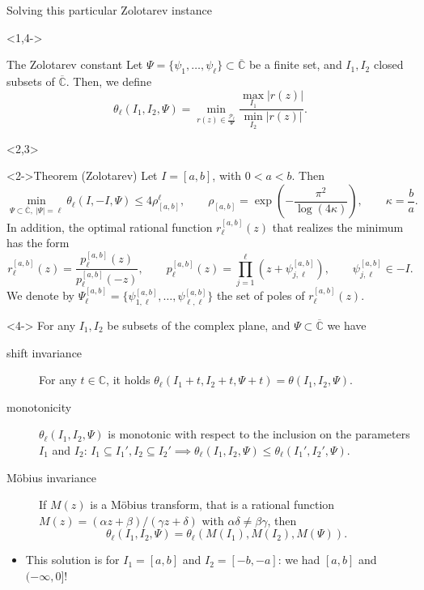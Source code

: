 \documentclass[aspectratio=169,xcolor=dvipsnames]{beamer}
\newcommand{\pole}{\psi}
\newcommand{\Pole}{\Psi}
\begin{document}
	\begin{frame}{\faHammer\;Solving this particular Zolotarev instance}
	
	\begin{onlyenv}<1,4->
	\begin{block}{The Zolotarev constant}
	Let $\Pole = \{\pole_1,\dots,\pole_\ell\} \subset \overline{\mathbb C}$ 
	be a finite set, and $I_1, I_2$ closed subsets of $\overline{\mathbb C}$. Then, we define
	\[
	\theta_\ell(I_1, I_2, \Pole) =  \min_{r(z)\in \frac{\mathcal P_\ell}{\Pole}} \frac{\max_{I_1}|r(z)|}{\min_{I_2}|r(z)|}.
	\]
	\end{block}
	\end{onlyenv}
	\begin{onlyenv}<2,3>
	\begin{alertblock}<2->{Theorem (Zolotarev)}
	Let $I = [a, b]$, with $0<a<b$. Then 
	\[
	\min_{\Pole\subset\overline{\mathbb  C}, \ |\Pole|=\ell }\theta_\ell(I,-I,\Pole) \leq 4\rho_{[a,b]}^{\ell},\qquad \rho_{[a,b]}=\exp\left(-\frac{\pi^2}{\log\left(4 \kappa\right)}\right),\qquad \kappa=\frac ba.
	\]
	In addition, the optimal rational function $r^{[a,b]}_\ell(z)$ that realizes the minimum
	has the form
	\[
	r^{[a,b]}_\ell(z) = \frac{p^{[a,b]}_\ell(z)}{p^{[a,b]}_\ell(-z)}, \qquad 
	p^{[a,b]}_\ell(z) = \prod_{j = 1}^\ell (z + \pole^{[a,b]}_{j,\ell}), \qquad 
	\pole^{[a,b]}_{j,\ell} \in -I. 
	\]
	We denote by $\Pole_{\ell}^{[a,b]} = \{ \pole_{1,\ell}^{[a,b]}, \dots, \pole_{\ell,\ell}^{[a,b]} \}$ the set of poles of $r^{[a,b]}_\ell(z)$.
	\end{alertblock}
	\end{onlyenv}

	\begin{onlyenv}<4->
	For any $I_1, I_2$ be subsets of the complex plane, and $\Pole\subset\overline{\mathbb C}$ we have
	\begin{description}
		\item[shift invariance] For any $t \in \mathbb C$, it holds
		$\theta_\ell(I_1 + t, I_2 + t, \Pole+t) = \theta(I_1, I_2, \Pole)$.
		\item[monotonicity] 
		$\theta_\ell(I_1, I_2, \Pole)$ is monotonic with respect to the
		inclusion on the parameters $I_1$ and $I_2$:
		$
		I_1 \subseteq I_1', I_2 \subseteq I_2' \implies 
		\theta_\ell(I_1, I_2, \Pole) \leq \theta_\ell(I_1', I_2', \Pole). 
		$
		\item[M\"obius invariance] If $M(z)$ is a M\"obius transform, that is a rational
		function $M(z) = (\alpha z + \beta) / (\gamma z + \delta)$ with $\alpha\delta \neq \beta\gamma$, then 
		\[
		\theta_\ell(I_1, I_2, \Pole) = \theta_\ell(M(I_1), M(I_2), M(\Pole)).
		\]
	\end{description}
	\end{onlyenv}

	\begin{itemize}
	\item[\alert{\faExclamationTriangle}]<3-> This solution is for $I_1 = [a,b]$ and $I_2 = [-b,-a]$: we had $[a,b]$ and $(-\infty,0]$!
	\end{itemize}
	
	\end{frame}
\end{document}
